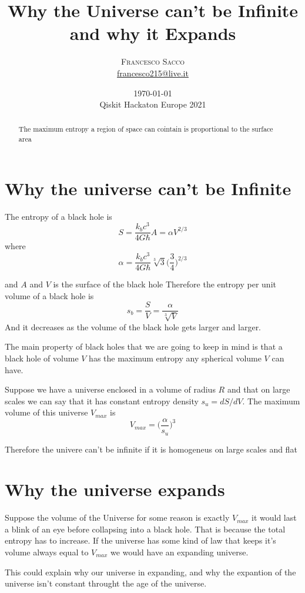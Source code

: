\documentclass[10pt,twoside]{article}
\title{Why the Universe can't be Infinite and why it Expands} %
\author{%
\textsc{Francesco Sacco}\\[1ex] %
\normalsize \href{mailto:francesco215@live.it}{francesco215@live.it} %
}
\date{
    \small\today\\
    \small{\small{Qiskit Hackaton Europe 2021}}} %
\begin{document}
\maketitle

\begin{abstract}
The maximum entropy a region of space can cointain is proportional to the surface area
\end{abstract}
\vspace{0.2cm}
\begin{multicols}{2}

\section{Why the universe can't be Infinite}
	The entropy of a black hole is
	\begin{equation}
		S=\frac{k_b c^3}{4G\hbar} A=\alpha V^{2/3}
	\end{equation}
	where
	\begin{equation}
		\alpha=\frac{k_b c^3}{4G\hbar} \sqrt[3]{3}\bigg(\frac34\bigg)^{2/3}
	\end{equation}

	and $A$ and $V$ is the surface of the black hole\newline
	Therefore the entropy per unit volume of a black hole is
	\begin{equation}
		s_b=\frac SV=\frac{\alpha}{\sqrt[3]{V}}
	\end{equation}
	And it decreases as the volume of the black hole gets larger and larger.


	The main property of black holes that we are going to keep in mind is that a black hole of volume $V$ has the maximum entropy any spherical volume $V$ can have.


	Suppose we have a universe enclosed in a volume of radius $R$ and that on large scales we can say that it has constant entropy density $s_u=dS/dV$.\newline
	The maximum volume of this universe $V_{max}$ is
	\begin{equation}
		V_{max}= \bigg(\frac\alpha {s_u}\bigg)^3
	\end{equation}

	Therefore the univere can't be infinite if it is homogeneus on large scales and flat
\section{Why the universe expands}
	Suppose the volume of the Universe for some reason is exactly $V_{max}$ it would last a blink of an eye before collapsing into a black hole. That is because the total entropy has to increase.
	If the universe has some kind of law that keeps it's volume always equal to $V_{max}$ we would have an expanding universe.

	This could explain why our universe in expanding, and why the expantion of the universe isn't constant throught the age of the universe.

\end{multicols}
\end{document}
